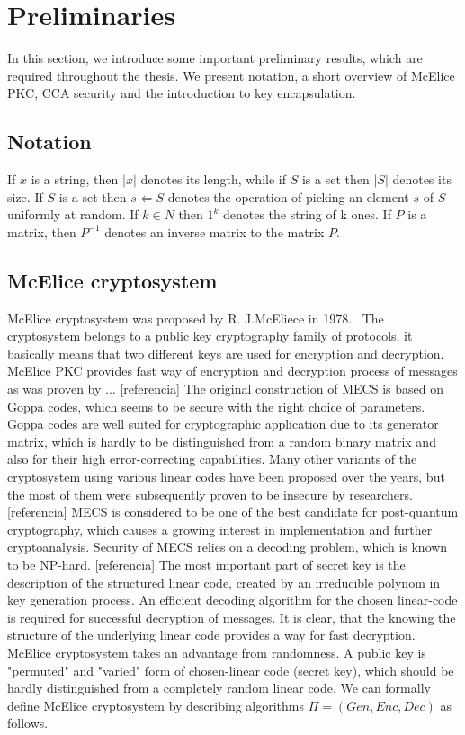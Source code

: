 \section{Preliminaries}
In this section, we introduce some important preliminary results, which are required throughout the thesis. We present notation, a short overview of McElice PKC, CCA security and the introduction to key encapsulation.

\subsection{Notation}
 If $x$ is a string, then $|x|$ denotes its length, while if $S$ is a set then $|S|$ denotes its size.
 If $S$ is a set then $s \Leftarrow S$ denotes the operation of picking an element $s$ of $S$ uniformly at random. If $k \in N$ then $1^k$ denotes the string of k ones. If $P$ is a matrix, then $P^{-1}$ denotes an inverse matrix to the matrix $P$.

\subsection{McElice cryptosystem}
\noindent McElice cryptosystem was proposed by R. J.McEliece in 1978.~\cite{mceliece1978public} The cryptosystem belongs to a public key cryptography family of protocols, it basically means that two different keys are used for encryption and decryption. McElice PKC provides fast way of encryption and decryption process of messages as was proven by ... [referencia]
The original construction of MECS is based on Goppa codes, which seems to be secure with the right choice of parameters. Goppa codes are well suited for cryptographic application due to its generator matrix, which is hardly to be distinguished from a random binary matrix and also for their high error-correcting capabilities. Many other variants of the cryptosystem using various linear codes have been proposed over the years, but the most of them were subsequently proven to be insecure by researchers. [referencia] MECS is considered to be one of the best candidate for post-quantum cryptography, which causes a growing interest in implementation and further cryptoanalysis. Security of MECS relies on a decoding problem, which is known to be NP-hard. [referencia]
The most important part of secret key is the description of the structured linear code, created by an irreducible polynom in key generation process. An efficient decoding algorithm for the chosen linear-code is required for successful decryption of messages. It is clear, that the knowing the structure of the underlying linear code provides a way for fast decryption. McElice cryptosystem takes an advantage from randomness. A public key is "permuted" and "varied" form of chosen-linear code (secret key), which should be hardly distinguished from a completely random linear code. We can formally define McElice cryptosystem by describing algorithms $\Pi = (Gen, Enc, Dec)$ as follows.


